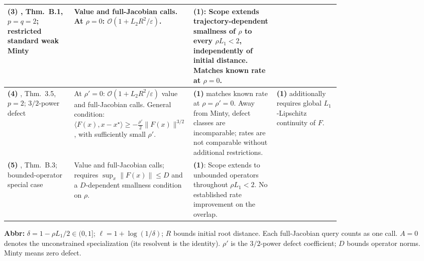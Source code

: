 \begin{table}[tp]
\begin{threeparttable}
\begin{tabularx}{\linewidth}{@{}>{\raggedright\arraybackslash}p{0.20\linewidth}>{\raggedright\arraybackslash}p{0.32\linewidth}>{\raggedright\arraybackslash}p{0.25\linewidth}>{\raggedright\arraybackslash}X@{}}
\midrule
\textbf{(3)} \citep{wmsoVyas2023v1}, Thm.~B.1, $p=q=2$; restricted standard weak Minty
& Value and full-Jacobian calls. At $\rho=0$: $\mathcal{O}(1+L_2R^2/\varepsilon)$.
& \textbf{(1)}: Scope extends trajectory-dependent smallness of $\rho$ to every $\rho L_1<2$, independently of initial distance. Matches known rate at $\rho=0$.
& \\
\midrule
\textbf{(4)} \citep{wmsoVyas2023v1}, Thm.~3.5, $p=2$; $3/2$-power defect
& At $\rho'=0$: $\mathcal{O}(1+L_2R^2/\varepsilon)$ value and full-Jacobian calls. General condition: $\langle F(x),x-x^\star\rangle\ge-\frac{\rho'}2\|F(x)\|^{3/2}$, with sufficiently small $\rho'$.
& \textbf{(1)} matches known rate at $\rho=\rho'=0$. Away from Minty, defect classes are incomparable; rates are not comparable without additional restrictions.
& \textbf{(1)} additionally requires global $L_1$-Lipschitz continuity of $F$. \\
\midrule
\textbf{(5)} \citep{wmsoVyas2026v1}, Thm.~B.3; bounded-operator special case
& Value and full-Jacobian calls; requires $\sup_x\|F(x)\|\le D$ and a $D$-dependent smallness condition on $\rho$.
& \textbf{(1)}: Scope extends to unbounded operators throughout $\rho L_1<2$. No established rate improvement on the overlap.
& \\
\bottomrule
\end{tabularx}
\begin{tablenotes}[flushleft]\footnotesize
\item[] \textbf{Abbr:} $\delta=1-\rho L_1/2\in(0,1]$; $\ell=1+\log(1/\delta)$; $R$ bounds initial root distance. Each full-Jacobian query counts as one call. $A=0$ denotes the unconstrained specialization (its resolvent is the identity). $\rho'$ is the $3/2$-power defect coefficient; $D$ bounds operator norms. Minty means zero defect.
\end{tablenotes}
\end{threeparttable}
\end{table}
\clearpage
